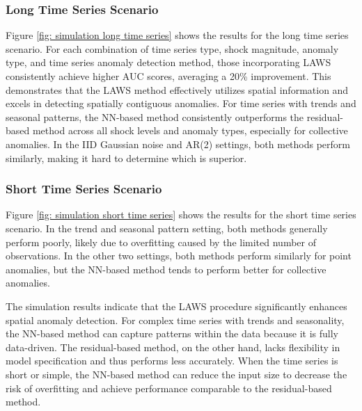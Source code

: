 \documentclass[11pt]{article}
\begin{document}
\subsubsection*{Long Time Series Scenario}
Figure \ref{fig: simulation long time series} shows the results for the long time series scenario. For each combination of time series type, shock magnitude, anomaly type, and time series anomaly detection method, those incorporating LAWS consistently achieve higher AUC scores, averaging a 20\% improvement. This demonstrates that the LAWS method effectively utilizes spatial information and excels in detecting spatially contiguous anomalies. For time series with trends and seasonal patterns, the NN-based method consistently outperforms the residual-based method across all shock levels and anomaly types, especially for collective anomalies. In the IID Gaussian noise and AR(2) settings, both methods perform similarly, making it hard to determine which is superior.

\subsubsection*{Short Time Series Scenario}
Figure \ref{fig: simulation short time series} shows the results for the short time series scenario. In the trend and seasonal pattern setting, both methods generally perform poorly, likely due to overfitting caused by the limited number of observations. In the other two settings, both methods perform similarly for point anomalies, but the NN-based method tends to perform better for collective anomalies. 


The simulation results indicate that the LAWS procedure significantly enhances spatial anomaly detection. For complex time series with trends and seasonality, the NN-based method can capture patterns within the data because it is fully data-driven. The residual-based method, on the other hand, lacks flexibility in model specification and thus performs less accurately. When the time series is short or simple, the NN-based method can reduce the input size to decrease the risk of overfitting and achieve performance comparable to the residual-based method.
\end{document}
